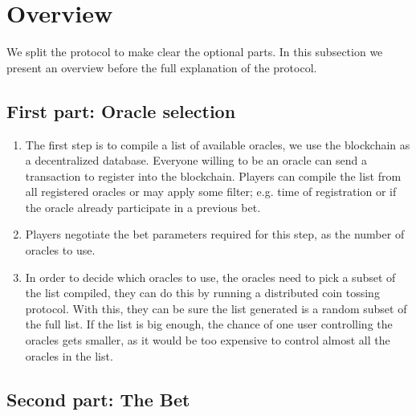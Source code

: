 \section{Overview}

We split the protocol to make clear the optional parts.
In this subsection we present an overview before the full explanation of the
  protocol.

\subsection{First part: Oracle selection}

\begin{enumerate}
  \item The first step is to compile a list of available oracles, we use the
      blockchain as a decentralized database.
      Everyone willing to be an oracle can send a transaction to register into
      the blockchain.
      Players can compile the list from all registered oracles or may apply
      some filter; e.g. time of registration or if the oracle already participate
      in a previous bet.
  \item Players negotiate the bet parameters required for this step, as the
      number of oracles to use.
  \item In order to decide which oracles to use, the oracles need to pick a
      subset of the list compiled, they can do this by running a distributed
      coin tossing protocol.
    With this, they can be sure the list generated is a random subset of the
      full list. If the list is big enough, the chance of one user controlling
      the oracles gets smaller, as it would be too expensive to control almost
      all the oracles in the list.
\end{enumerate}

\subsection{Second part: The Bet}

